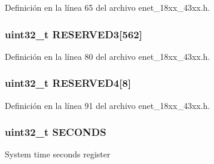 Definición en la línea 65 del archivo enet\+\_\+18xx\+\_\+43xx.\+h.

\subsubsection[{\texorpdfstring{R\+E\+S\+E\+R\+V\+E\+D3}{RESERVED3}}]{ uint32\+\_\+t R\+E\+S\+E\+R\+V\+E\+D3\mbox{[}562\mbox{]}}\hypertarget{struct_l_p_c___e_n_e_t___t_abe64ca5c6817fc151f9168e346ba8f13}{}\label{struct_l_p_c___e_n_e_t___t_abe64ca5c6817fc151f9168e346ba8f13}


Definición en la línea 80 del archivo enet\+\_\+18xx\+\_\+43xx.\+h.

\subsubsection[{\texorpdfstring{R\+E\+S\+E\+R\+V\+E\+D4}{RESERVED4}}]{ uint32\+\_\+t R\+E\+S\+E\+R\+V\+E\+D4\mbox{[}8\mbox{]}}\hypertarget{struct_l_p_c___e_n_e_t___t_a944ffea0e77c1cf36c7b047b3466882c}{}\label{struct_l_p_c___e_n_e_t___t_a944ffea0e77c1cf36c7b047b3466882c}


Definición en la línea 91 del archivo enet\+\_\+18xx\+\_\+43xx.\+h.

\subsubsection[{\texorpdfstring{S\+E\+C\+O\+N\+DS}{SECONDS}}]{ uint32\+\_\+t S\+E\+C\+O\+N\+DS}\hypertarget{struct_l_p_c___e_n_e_t___t_a499fd79274805d17ebceb8b0824c7e2c}{}\label{struct_l_p_c___e_n_e_t___t_a499fd79274805d17ebceb8b0824c7e2c}
System time seconds register 

